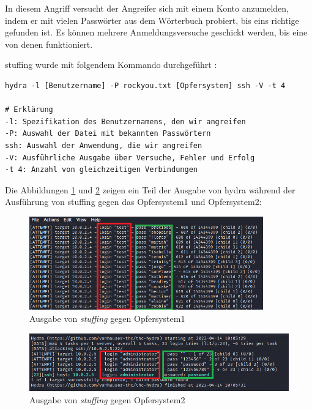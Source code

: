 In diesem Angriff versucht der Angreifer sich mit einem Konto anzumelden, indem er mit vielen Passwörter aus dem Wörterbuch probiert, bis eins richtige gefunden ist. Es können mehrere Anmeldungsversuche geschickt werden, bis eine von denen funktioniert.

\newpage
\gls{stuffing} wurde mit folgendem Kommando durchgeführt \citep{kali_hydra}:
{
\begin{Verbatim}[frame=single]
hydra -l [Benutzername] -P rockyou.txt [Opfersystem] ssh -V -t 4

# Erklärung
-l: Spezifikation des Benutzernamens, den wir angreifen
-P: Auswahl der Datei mit bekannten Passwörtern
ssh: Auswahl der Anwendung, die wir angreifen
-V: Ausführliche Ausgabe über Versuche, Fehler und Erfolg
-t 4: Anzahl von gleichzeitigen Verbindungen
\end{Verbatim}
}

Die Abbildungen \ref{fig:Ausgabe_Stuffing_Opfer1} und \ref{fig:Ausgabe_Stuffing_Opfer2} zeigen ein Teil der Ausgabe von \gls{hydra} während der Ausführung von \gls{stuffing} gegen das Opfersystem1 und Opfersystem2:
\begin{figure}[H]
   \centering
   \includegraphics[width=0.9\textwidth]{assets/stuffing_kali.png}
   \caption[Ausgabe von \textit{\gls{stuffing}} gegen Opfersystem1]
   {Ausgabe von \textit{\gls{stuffing}} gegen Opfersystem1}
   \label{fig:Ausgabe_Stuffing_Opfer1}
   \centering
\end{figure}

\begin{figure}[H]
   \centering
   \includegraphics[width=1\textwidth]{assets/stuffing_kali2.png}
   \caption[Ausgabe von \textit{\gls{stuffing}} gegen Opfersystem2]
   {Ausgabe von \textit{\gls{stuffing}} gegen Opfersystem2}
   \label{fig:Ausgabe_Stuffing_Opfer2}
   \centering
\end{figure}

